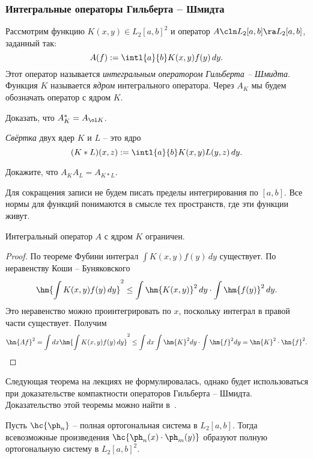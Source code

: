 \documentclass[a4paper]{article}
\begin{document}
\subsubsection{Интегральные операторы Гильберта -- Шмидта}

\begin{df}
Рассмотрим функцию $K(x,y) \in L_2[a,b]^2$ и
оператор $A\cln L_2[a,b] \ra L_2[a,b]$, заданный так:
$$A(f) := \intl{a}{b}K(x,y)f(y)\,dy.$$
Этот оператор называется \emph{интегральным оператором Гильберта -- Шмидта}.
Функция $K$ называется \emph{ядром} интегрального оператора. Через $A_K$ мы будем обозначать
оператор с ядром $K$.
\end{df}

\begin{problem}
Доказать, что $A_K^* = A_{\ol K}$.
\end{problem}

\begin{df}
\emph{Свёртка} двух ядер $K$ и $L$ -- это ядро
$$(K*L)(x,z) := \intl{a}{b}K(x,y)L(y,z)\,dy.$$
\end{df}

\begin{problem}
Докажите, что $A_K A_L = A_{K*L}$.
\end{problem}

Для сокращения записи не будем писать пределы интегрирования по $[a,b]$.
Все нормы для функций понимаются в смысле тех пространств, где эти функции живут.

\begin{stm}
Интегральный оператор $A$ с ядром $K$ ограничен.
\end{stm}
\begin{proof}
По теореме Фубини интеграл $\int K(x,y)f(y)\,dy$ существует. По неравенству Коши -- Буняковского
$$\hm{\int K(x,y) f(y)\, dy}^2 \le \int \hm{K(x,y)}^2\,dy \cdot \int \hm{f(y)}^2\,dy.$$
Это неравенство можно проинтегрировать по $x$, поскольку интеграл
в правой части существует. Получим
$$\hn{A f}^2 = \int dx \hm{\int K(x,y)f(y)\,dy}^2 \le \int dx \int \hm{K}^2dy \cdot \int\hm{f}^2dy =
\hn{K}^2\cdot \hn{f}^2.$$
\hfill\end{proof}


Следующая теорема на лекциях не формулировалась, однако будет использоваться
при доказательстве компактности операторов Гильберта -- Шмидта. Доказательство этой теоремы можно
найти в~\cite[гл.VII, \S~3, п.~5]{kf}.

\begin{theorem}
Пусть $\hc{\ph_n}$ -- полная ортогональная система в $L_2[a,b]$. Тогда всевозможные произведения
$\hc{\ph_n(x)\cdot\ph_m(y)}$ образуют полную ортогональную систему в $L_2[a,b]^2$.
\end{theorem}
\end{document}
